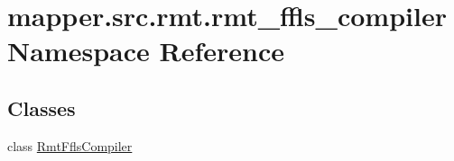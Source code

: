 \hypertarget{namespacemapper_1_1src_1_1rmt_1_1rmt__ffls__compiler}{}\section{mapper.\+src.\+rmt.\+rmt\+\_\+ffls\+\_\+compiler Namespace Reference}
\label{namespacemapper_1_1src_1_1rmt_1_1rmt__ffls__compiler}
\subsection*{Classes}
\begin{DoxyCompactItemize}
\item 
class \hyperlink{classmapper_1_1src_1_1rmt_1_1rmt__ffls__compiler_1_1_rmt_ffls_compiler}{Rmt\+Ffls\+Compiler}
\end{DoxyCompactItemize}
